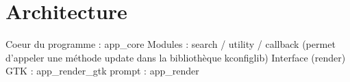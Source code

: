 \documentclass[16pts]{report}
\begin{document}

\nocite{*}

\chapter{Architecture}
\label{cha:Architecture}

Coeur du programme : app\_core
Modules : search / utility / callback (permet d'appeler une méthode update
    dans la bibliothèque kconfiglib)
Interface (render) GTK : app\_render\_gtk
prompt : app\_render
\end{document}
